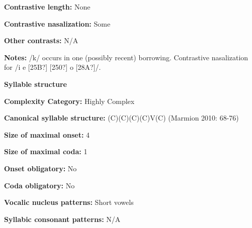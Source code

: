 \begin{styleBody}
\textbf{Contrastive length:} None
\end{styleBody}

\begin{styleBody}
\textbf{Contrastive nasalization:} Some
\end{styleBody}

\begin{styleBody}
\textbf{Other contrasts:} N/A
\end{styleBody}

\begin{styleBody}
\textbf{Notes:} /k/ occurs in one (possibly recent) borrowing. Contrastive nasalization for /i e [25B?] [250?] o [28A?]/.
\end{styleBody}

\begin{styleBody}
\textbf{Syllable structure}
\end{styleBody}

\begin{styleBody}
\textbf{Complexity Category: }Highly Complex
\end{styleBody}

\begin{styleBody}
\textbf{Canonical syllable structure:} (C)(C)(C)(C)V(C)\textbf{ }(Marmion 2010: 68-76)
\end{styleBody}

\begin{styleBody}
\textbf{Size of maximal onset:} 4
\end{styleBody}

\begin{styleBody}
\textbf{Size of maximal coda:} 1
\end{styleBody}

\begin{styleBody}
\textbf{Onset obligatory:} No
\end{styleBody}

\begin{styleBody}
\textbf{Coda obligatory:} No
\end{styleBody}

\begin{styleBody}
\textbf{Vocalic nucleus patterns:} Short vowels
\end{styleBody}

\begin{styleBody}
\textbf{Syllabic consonant patterns:} N/A
\end{styleBody}

